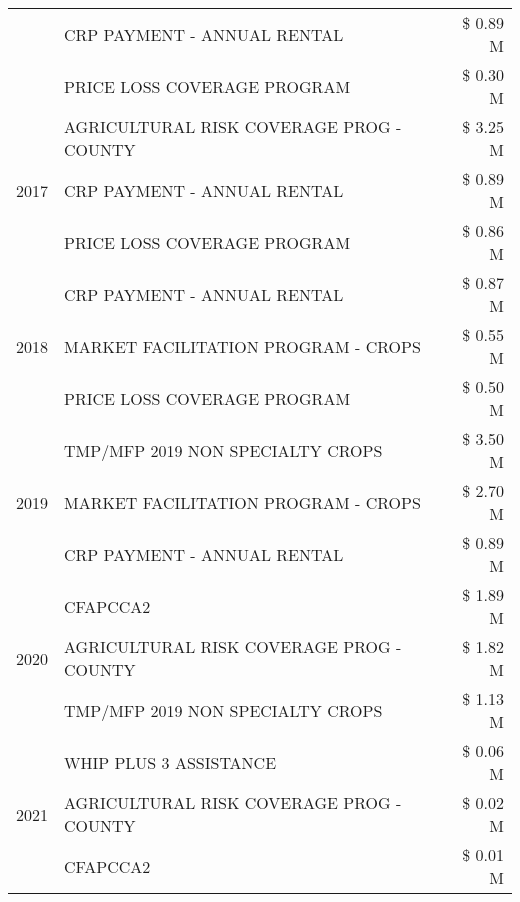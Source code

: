 \begin{tabular}{llr}
 & CRP PAYMENT - ANNUAL RENTAL & \$ 0.89 M \\
 & PRICE LOSS COVERAGE PROGRAM & \$ 0.30 M \\
\cline{1-3}
\multirow[t]{3}{*}{2017} & AGRICULTURAL RISK COVERAGE PROG - COUNTY & \$ 3.25 M \\
 & CRP PAYMENT - ANNUAL RENTAL & \$ 0.89 M \\
 & PRICE LOSS COVERAGE PROGRAM & \$ 0.86 M \\
\cline{1-3}
\multirow[t]{3}{*}{2018} & CRP PAYMENT - ANNUAL RENTAL & \$ 0.87 M \\
 & MARKET FACILITATION PROGRAM - CROPS & \$ 0.55 M \\
 & PRICE LOSS COVERAGE PROGRAM & \$ 0.50 M \\
\cline{1-3}
\multirow[t]{3}{*}{2019} & TMP/MFP 2019 NON SPECIALTY CROPS & \$ 3.50 M \\
 & MARKET FACILITATION PROGRAM - CROPS & \$ 2.70 M \\
 & CRP PAYMENT - ANNUAL RENTAL & \$ 0.89 M \\
\cline{1-3}
\multirow[t]{3}{*}{2020} & CFAPCCA2 & \$ 1.89 M \\
 & AGRICULTURAL RISK COVERAGE PROG - COUNTY & \$ 1.82 M \\
 & TMP/MFP 2019 NON SPECIALTY CROPS & \$ 1.13 M \\
\cline{1-3}
\multirow[t]{3}{*}{2021} & WHIP PLUS 3 ASSISTANCE & \$ 0.06 M \\
 & AGRICULTURAL RISK COVERAGE PROG - COUNTY & \$ 0.02 M \\
 & CFAPCCA2 & \$ 0.01 M \\
\cline{1-3}
\bottomrule
\end{tabular}
